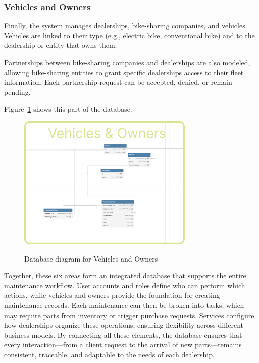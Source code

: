 \subsubsection{Vehicles and Owners} 


Finally, the system manages dealerships, bike-sharing companies, and vehicles. Vehicles are linked to their type (e.g., electric bike, conventional bike) and to the dealership or entity that owns them.

Partnerships between bike-sharing companies and dealerships are also modeled, allowing bike-sharing entities to grant specific dealerships access to their fleet information. Each partnership request can be accepted, denied, or remain pending.

Figure~\ref{fig:dbVehicles} shows this part of the database.

\begin{figure}[h]
  \caption{Database diagram for Vehicles and Owners}
  \centering
  \includegraphics[width=0.75\textwidth]{figs/dbDiagrams/Vehicles_and_Owners}
  \label{fig:dbVehicles}
\end{figure}


Together, these six areas form an integrated database that supports the entire maintenance workflow. User accounts and roles define who can perform which actions, while vehicles and owners provide the foundation for creating maintenance records. Each maintenance can then be broken into tasks, which may require parts from inventory or trigger purchase requests. Services configure how dealerships organize these operations, ensuring flexibility across different business models. By connecting all these elements, the database ensures that every interaction—from a client request to the arrival of new parts—remains consistent, traceable, and adaptable to the needs of each dealership.

